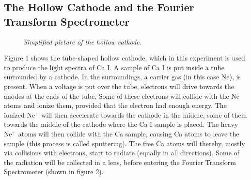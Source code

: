 \documentclass[a4paper]{article}
\begin{document}
\subsection{The Hollow Cathode and the Fourier Transform Spectrometer}

\begin{figure}[htb!]
\label{HC}
\begin{center}
\end{center}
\caption{\textit{Simplified picture of the hollow cathode.}}
\end{figure}

Figure 1 shows the tube-shaped hollow cathode, which in this experiment is used to produce the light spectra of Ca I. A sample of Ca I is put inside a tube surrounded by a cathode. In the surroundings, a carrier gas (in this case Ne), is present. When a voltage is put over the tube, electrons will drive towards the anodes at the ends of the tube. Some of these electrons will collide with the Ne atoms and ionize them, provided that the electron had enough energy. The ionized Ne$^+$ will then accelerate towards the cathode in the middle, some of them towards the middle of the cathode where the Ca I sample is placed. The heavy Ne$^+$ atoms will then collide with the Ca sample, causing Ca atoms to leave the sample (this process is called sputtering). The free Ca atoms will thereby, mostly via collisions with electrons, start to radiate (equally in all directions). Some of the radiation will be collected in a lens, before entering the Fourier Transform Spectrometer (shown in figure 2).
\end{document}
